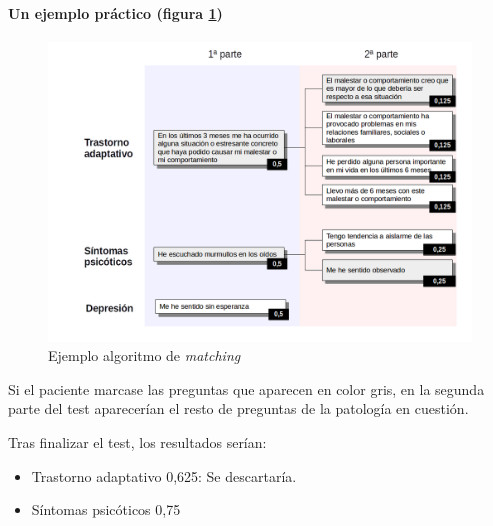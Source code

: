 \paragraph{Un ejemplo práctico (figura \ref{ej_alg_match})}


\begin{figure}[htbp] 
    \centering
    \includegraphics[width=1\textwidth]{figuras/alg_matching.png}
    \caption{Ejemplo algoritmo de \textit{matching}}
    \label{ej_alg_match}
\end{figure}	

Si el paciente marcase las preguntas que aparecen en color gris, en la segunda parte del test aparecerían el resto de preguntas de la patología en cuestión.


Tras finalizar el test, los resultados serían:

\begin{itemize}
\item Trastorno adaptativo 0,625: Se descartaría.
\item Síntomas psicóticos 0,75
\end{itemize}


